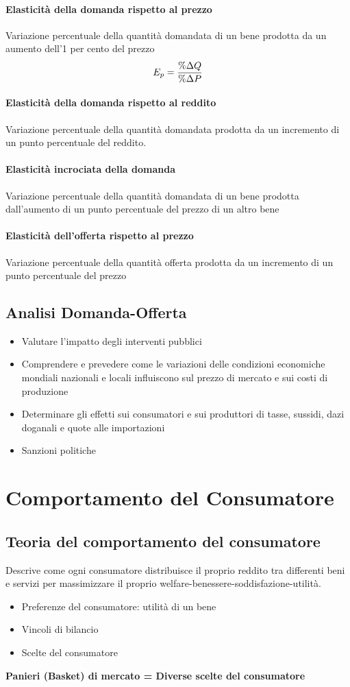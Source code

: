 \documentclass[12pt]{article}
\begin{document}
\paragraph{Elasticità della domanda rispetto al prezzo} Variazione percentuale della quantità domandata di un bene prodotta da un aumento dell’1 per cento del prezzo
$$E_p={\% \Delta Q \over{\% \Delta P }}$$
\paragraph{Elasticità della domanda rispetto al reddito}
Variazione percentuale della quantità domandata prodotta da un incremento di un punto percentuale del reddito.
\paragraph{Elasticità incrociata della domanda}
Variazione percentuale della quantità domandata di un bene prodotta dall’aumento di un punto percentuale del prezzo di un altro bene
\paragraph{Elasticità dell’offerta rispetto al prezzo}
Variazione percentuale della quantità offerta prodotta da un incremento di un punto percentuale del prezzo
\subsection{Analisi Domanda-Offerta}
\begin{itemize}
    \item Valutare l’impatto degli interventi pubblici
    \item Comprendere e prevedere come le variazioni delle condizioni economiche mondiali nazionali e locali influiscono sul prezzo di mercato e sui costi di produzione
    \item Determinare gli effetti sui consumatori e sui produttori di tasse, sussidi, dazi doganali e quote alle importazioni
    \item Sanzioni politiche
\end{itemize}
\newpage
\section{Comportamento del Consumatore}
\subsection{Teoria del comportamento del consumatore}
Descrive come ogni consumatore distribuisce il proprio reddito tra differenti beni e servizi per massimizzare il proprio welfare-benessere-soddisfazione-utilità.
\begin{itemize}
    \item Preferenze del consumatore: utilità di un bene
    \item Vincoli di bilancio
    \item Scelte del consumatore
\end{itemize}
\textbf{Panieri (Basket) di mercato = Diverse scelte del consumatore}
\end{document}
